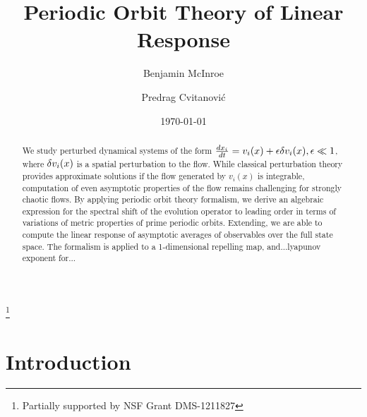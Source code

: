 \documentclass[aps,pre,
                showpacs,
                twocolumn,
                groupedaddress,
                superscriptaddress,
                floatfix]{revtex4-1}
\begin{document}
\title{Periodic Orbit Theory of Linear Response}
\author{Benjamin McInroe}
\author{Predrag Cvitanovi\'c}
\thanks{Partially supported by NSF Grant DMS-1211827}

\date{\today}

\begin{abstract}
We study perturbed dynamical systems of the form $\frac{dx_{i}}{dt} = v_{i}(x) + \epsilon \delta v_{i}(x), \epsilon \ll 1$,
where $\delta v_{i}(x)$ is a spatial perturbation to the flow. While classical perturbation theory provides approximate solutions if the flow generated by $v_{i}(x)$ is integrable, computation of even asymptotic properties of the flow remains challenging for strongly chaotic flows. By applying periodic orbit theory formalism, we derive an algebraic expression for the spectral shift of the evolution operator to leading order in terms of variations of metric properties of prime periodic orbits. Extending, we are able to compute the linear response of asymptotic averages of observables over the full state space. The formalism is applied to a 1-dimensional repelling map, and...lyapunov exponent for...

\end{abstract}

\maketitle



\section{Introduction}
\label{sect:intro}
\end{document}
